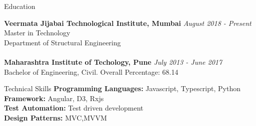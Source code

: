 \documentclass{resume} %
\begin{document}

\begin{rSection}{Education}

{\bf Veermata Jijabai Technological Institute, Mumbai} \hfill {\em August 2018 - Present} 
\\ Master in Technology
\\ Department of Structural Engineering\\
\\{\bf Maharashtra Institute of Techology, Pune} \hfill {\em July 2013 - June 2017} 
\\ Bachelor of Engineering, Civil.\hfill { Overall Percentage: 68.14 }


\end{rSection}

\begin{rSection}{Technical Skills}
\textbf{Programming Languages:} Javascript, Typescript, Python\\
\textbf{Framework:} Angular, D3, Rxjs\\
\textbf{Test Automation:} Test driven development\\
\textbf{Design Patterns:} MVC,MVVM\\
\end{rSection}

\end{document}
